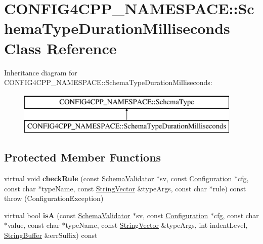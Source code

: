 \hypertarget{classCONFIG4CPP__NAMESPACE_1_1SchemaTypeDurationMilliseconds}{\section{C\-O\-N\-F\-I\-G4\-C\-P\-P\-\_\-\-N\-A\-M\-E\-S\-P\-A\-C\-E\-:\-:Schema\-Type\-Duration\-Milliseconds Class Reference}
\label{classCONFIG4CPP__NAMESPACE_1_1SchemaTypeDurationMilliseconds}
}
Inheritance diagram for C\-O\-N\-F\-I\-G4\-C\-P\-P\-\_\-\-N\-A\-M\-E\-S\-P\-A\-C\-E\-:\-:Schema\-Type\-Duration\-Milliseconds\-:\begin{figure}[H]
\begin{center}
\leavevmode
\includegraphics[height=2.000000cm]{classCONFIG4CPP__NAMESPACE_1_1SchemaTypeDurationMilliseconds}
\end{center}
\end{figure}
\subsection*{Protected Member Functions}
\begin{DoxyCompactItemize}
\item 
\hypertarget{classCONFIG4CPP__NAMESPACE_1_1SchemaTypeDurationMilliseconds_a5a8e7547cded8a7e6b88293f7638907f}{virtual void {\bfseries check\-Rule} (const \hyperlink{classCONFIG4CPP__NAMESPACE_1_1SchemaValidator}{Schema\-Validator} $\ast$sv, const \hyperlink{classCONFIG4CPP__NAMESPACE_1_1Configuration}{Configuration} $\ast$cfg, const char $\ast$type\-Name, const \hyperlink{classCONFIG4CPP__NAMESPACE_1_1StringVector}{String\-Vector} \&type\-Args, const char $\ast$rule) const   throw (\-Configuration\-Exception)}\label{classCONFIG4CPP__NAMESPACE_1_1SchemaTypeDurationMilliseconds_a5a8e7547cded8a7e6b88293f7638907f}

\item 
\hypertarget{classCONFIG4CPP__NAMESPACE_1_1SchemaTypeDurationMilliseconds_a3734631f1b28c71a15c4368715419749}{virtual bool {\bfseries is\-A} (const \hyperlink{classCONFIG4CPP__NAMESPACE_1_1SchemaValidator}{Schema\-Validator} $\ast$sv, const \hyperlink{classCONFIG4CPP__NAMESPACE_1_1Configuration}{Configuration} $\ast$cfg, const char $\ast$value, const char $\ast$type\-Name, const \hyperlink{classCONFIG4CPP__NAMESPACE_1_1StringVector}{String\-Vector} \&type\-Args, int indent\-Level, \hyperlink{classCONFIG4CPP__NAMESPACE_1_1StringBuffer}{String\-Buffer} \&err\-Suffix) const }\label{classCONFIG4CPP__NAMESPACE_1_1SchemaTypeDurationMilliseconds_a3734631f1b28c71a15c4368715419749}

\end{DoxyCompactItemize}
